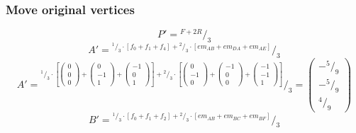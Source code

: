 \documentclass{article}
\newcommand*\rfrac[2]{{}^{#1}\!/_{#2}}%
\begin{document}
\subsubsection{Move original vertices}
\[P'=\rfrac{F+2R}{3}\]
\[A'=\rfrac{\rfrac{1}{3}\cdot\left[f_0+f_1+f_4\right]+
\rfrac{2}{3}\cdot\left[em_{AB}+em_{DA}+em_{AE}\right]
}{3}\]
\[A'=\rfrac{\rfrac{1}{3}\cdot\left[
\left({\begin{array}{c} 0 \\  0 \\ 0 \end{array}}\right)+
\left({\begin{array}{c} 0 \\  -1 \\ 1 \end{array}}\right)+
\left({\begin{array}{c} -1 \\  0 \\ 1 \end{array}}\right)\right]+
\rfrac{2}{3}\cdot\left[
\left({\begin{array}{c} 0 \\  -1 \\ 0 \end{array}}\right)+
\left({\begin{array}{c} -1 \\  0 \\ 0 \end{array}}\right)+
\left({\begin{array}{c} -1 \\  -1 \\ 1 \end{array}}\right)\right]
}{3}=\left({\begin{array}{c} -\rfrac{5}{9} \\  -\rfrac{5}{9} \\ \rfrac{4}{9} \end{array}}\right)\]
\[B'=\rfrac{\rfrac{1}{3}\cdot\left[f_0+f_1+f_2\right]+
\rfrac{2}{3}\cdot\left[em_{AB}+em_{BC}+em_{BF}\right]
}{3}\]
\end{document}

